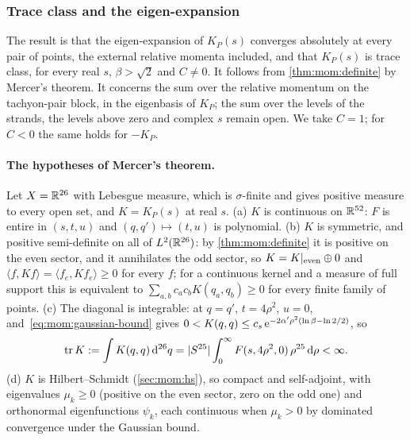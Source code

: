 \subsubsection{Trace class and the eigen-expansion}
\label{sec:mom:trace}


The result is that the eigen-expansion of $K_P(s)$ converges absolutely at every pair of points, the external relative momenta included, and that $K_P(s)$ is trace class, for every real $s$, $\beta > \sqrt{2}$ and $C \ne 0$.
It follows from \cref{thm:mom:definite} by Mercer's theorem.
It concerns the sum over the relative momentum on the tachyon-pair block, in the eigenbasis of $K_P$; the sum over the levels of the strands, the levels above zero and complex $s$ remain open.
We take $C = 1$; for $C < 0$ the same holds for $- K_P$.

\paragraph{The hypotheses of Mercer's theorem.}
Let $X = \mathbb{R}^{26}$ with Lebesgue measure, which is $\sigma$-finite and gives positive measure to every open set, and $K = K_P(s)$ at real $s$.
(a) $K$ is continuous on $\mathbb{R}^{52}$: $F$ is entire in $(s, t, u)$ and $(q, q') \mapsto (t, u)$ is polynomial.
(b) $K$ is symmetric, and positive semi-definite on all of $L^2(\mathbb{R}^{26})$: by \cref{thm:mom:definite} it is positive on the even sector, and it annihilates the odd sector, so $K = K|_{\rm even} \oplus 0$ and $\langle f, K f \rangle = \langle f_e, K f_e \rangle \ge 0$ for every $f$; for a continuous kernel and a measure of full support this is equivalent to $\sum_{a, b} c_a c_b K(q_a, q_b) \ge 0$ for every finite family of points.
(c) The diagonal is integrable: at $q = q'$, $t = 4 \rho^2$, $u = 0$, and~\eqref{eq:mom:gaussian-bound} gives $0 < K(q, q) \le c_s \, \mathrm{e}^{- 2 \alpha' \rho^2 (\ln \beta - \ln 2 / 2)}$, so
\begin{equation}
  \label{eq:mom:trace}
  \operatorname{tr} K
    := \int K(q, q) \, \mathrm{d}^{26} q
    = {|S^{25}|} \int_0^\infty F(s, 4 \rho^2, 0) \, \rho^{25} \, \mathrm{d} \rho
    < \infty.
\end{equation}
(d) $K$ is Hilbert--Schmidt (\cref{sec:mom:hs}), so compact and self-adjoint, with eigenvalues $\mu_k \ge 0$ (positive on the even sector, zero on the odd one) and orthonormal eigenfunctions $\psi_k$, each continuous when $\mu_k > 0$ by dominated convergence under the Gaussian bound.

